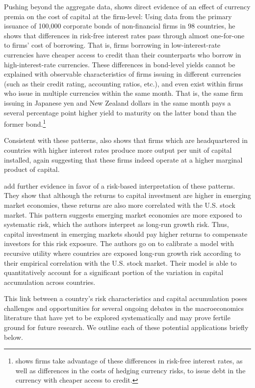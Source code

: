\documentclass{ar-1col}
\begin{document}
Pushing beyond the aggregate data, \citet{Richers2020} shows direct evidence of an effect of currency premia on the cost of capital at the firm-level: Using data from the primary issuance of 100,000 corporate bonds of non-financial firms in 98 countries, he shows that differences in risk-free interest rates pass through almost one-for-one to firms' cost of borrowing. That is, firms borrowing in low-interest-rate currencies have cheaper access to credit than their counterparts who borrow in high-interest-rate currencies. These differences in bond-level yields cannot be explained with observable characteristics of firms issuing in different currencies (such as their credit rating, accounting ratios, etc.), and even exist within firms who issue in multiple currencies within the same month. That is, the same firm issuing in Japanese yen and New Zealand dollars in the same month pays a several percentage point higher yield to maturity on the latter bond than the former bond.\footnote{\citet{Liao2020} shows firms take advantage of these differences in risk-free interest rates, as well as differences in the costs of hedging currency risks, to issue debt in the currency with cheaper access to credit.} 

Consistent with these patterns, \citet{Richers2020} also shows that firms which are headquartered in countries with higher interest rates produce more output per unit of capital installed, again suggesting that these firms indeed operate at a higher marginal product of capital.

\citet{DavidHenriksenSimonovska2014} add further evidence in favor of a risk-based interpretation of these patterns. They show that although the returns to capital investment are higher in emerging market economies, these returns are also more correlated with the U.S. stock market. This pattern suggests emerging market economies are more exposed to systematic risk, which the authors interpret as long-run growth risk. Thus, capital investment in emerging markets should pay higher returns to compensate investors for this risk exposure. The authors go on to calibrate a model with recursive utility where countries are exposed long-run growth risk according to their empirical correlation with the U.S. stock market. Their model is able to quantitatively account for a significant portion of the variation in capital accumulation across countries.

This link between a country's risk characteristics and capital accumulation poses challenges and opportunities for several ongoing debates in the macroeconomics literature that have yet to be explored systematically and may prove fertile ground for future research. We outline each of these potential applications briefly below.
\end{document}
